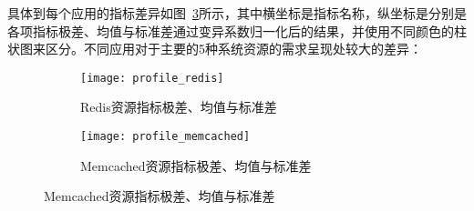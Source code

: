 具体到每个应用的指标差异如图~\ref{fig:resource_affinity_0}所示，其中横坐标是指标名称，纵坐标是分别是各项指标极差、均值与标准差通过变异系数归一化后的结果，并使用不同颜色的柱状图来区分。不同应用对于主要的5种系统资源的需求呈现处较大的差异：

\begin{figure}[H]
    \centering
    \begin{subfigure}[b]{0.85\textwidth}
      \texttt{[image: profile\_redis]}
      \caption{Redis资源指标极差、均值与标准差}
      \label{fig:profile_redis}
    \end{subfigure}
    \begin{subfigure}[b]{0.85\textwidth}
        \texttt{[image: profile\_memcached]}
        \caption{Memcached资源指标极差、均值与标准差}
        \label{fig:profile_memcached}
    \end{subfigure}
\label{fig:resource_affinity_0}
\end{figure}

